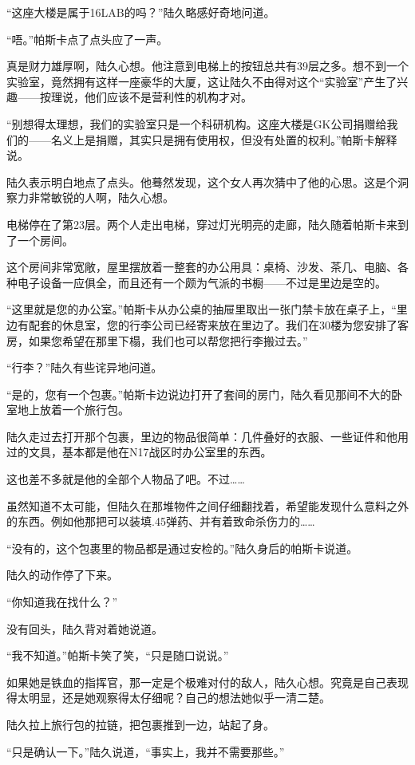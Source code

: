 “这座大楼是属于16LAB的吗？”陆久略感好奇地问道。

“唔。”帕斯卡点了点头应了一声。

真是财力雄厚啊，陆久心想。他注意到电梯上的按钮总共有39层之多。想不到一个实验室，竟然拥有这样一座豪华的大厦，这让陆久不由得对这个“实验室”产生了兴趣——按理说，他们应该不是营利性的机构才对。

“别想得太理想，我们的实验室只是一个科研机构。这座大楼是GK公司捐赠给我们的——名义上是捐赠，其实只是拥有使用权，但没有处置的权利。”帕斯卡解释说。

陆久表示明白地点了点头。他蓦然发现，这个女人再次猜中了他的心思。这是个洞察力非常敏锐的人啊，陆久心想。

电梯停在了第23层。两个人走出电梯，穿过灯光明亮的走廊，陆久随着帕斯卡来到了一个房间。

这个房间非常宽敞，屋里摆放着一整套的办公用具：桌椅、沙发、茶几、电脑、各种电子设备一应俱全，而且还有一个颇为气派的书橱——不过是里边是空的。

“这里就是您的办公室。”帕斯卡从办公桌的抽屉里取出一张门禁卡放在桌子上，“里边有配套的休息室，您的行李公司已经寄来放在里边了。我们在30楼为您安排了客房，如果您希望在那里下榻，我们也可以帮您把行李搬过去。”

“行李？”陆久有些诧异地问道。

“是的，您有一个包裹。”帕斯卡边说边打开了套间的房门，陆久看见那间不大的卧室地上放着一个旅行包。

陆久走过去打开那个包裹，里边的物品很简单：几件叠好的衣服、一些证件和他用过的文具，基本都是他在N17战区时办公室里的东西。

这也差不多就是他的全部个人物品了吧。不过……

虽然知道不太可能，但陆久在那堆物件之间仔细翻找着，希望能发现什么意料之外的东西。例如他那把可以装填.45弹药、并有着致命杀伤力的……

“没有的，这个包裹里的物品都是通过安检的。”陆久身后的帕斯卡说道。

陆久的动作停了下来。

“你知道我在找什么？”

没有回头，陆久背对着她说道。

“我不知道。”帕斯卡笑了笑，“只是随口说说。”

如果她是铁血的指挥官，那一定是个极难对付的敌人，陆久心想。究竟是自己表现得太明显，还是她观察得太仔细呢？自己的想法她似乎一清二楚。

陆久拉上旅行包的拉链，把包裹推到一边，站起了身。

“只是确认一下。”陆久说道，“事实上，我并不需要那些。”

